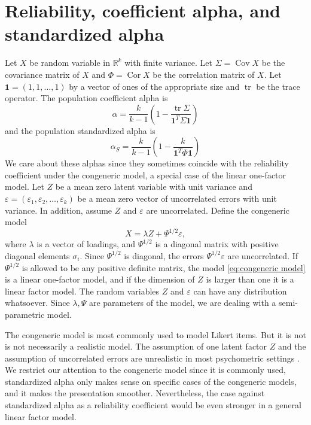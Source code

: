 \documentclass[twoside]{article}
\DeclareMathOperator{\tr}{tr}
\DeclareMathOperator{\Cor}{Cor}
\DeclareMathOperator{\Cov}{Cov}
\begin{document}
\section{Reliability, coefficient alpha, and standardized alpha}
\label{sec:coefficienta alpha}

Let $X$ be random variable in $\mathbb{R}^{k}$ with finite variance.
Let $\Sigma=\Cov X$ be the covariance matrix of $X$ and $\Phi=\Cor X$
be the correlation matrix of $X$. Let $\boldsymbol{1}=(1,1,\ldots,1)$ by a vector of ones of the appropriate size and $\tr$ be the trace operator.
The population coefficient alpha \citep[][eq. 2]{cronbach1951coefficient} is
\begin{equation}
\alpha =  \frac{k}{k-1}\left(1-\frac{\tr\Sigma}{\boldsymbol{1}^{T}\Sigma\boldsymbol{1}}\right)\label{eq:Coefficient alpha}
\end{equation}
and the population standardized alpha \citep[][eq. 2]{Falk2011-ae} is
\begin{equation}
\alpha_S=\frac{k}{k-1}\left(1-\frac{k}{\boldsymbol{1}^{T}\Phi\boldsymbol{1}}\right)\label{eq:standardized alpha}
\end{equation}
We care about these alphas since they sometimes coincide with the reliability coefficient under the congeneric model, a special case of the linear one-factor model. Let $Z$ be a mean zero latent variable with unit variance and $\varepsilon=(\varepsilon_{1},\varepsilon_{2},\ldots,\varepsilon_{k})$
be a mean zero vector of uncorrelated errors with unit variance. In addition, assume $Z$ and $\varepsilon$ are uncorrelated. Define the congeneric model
\begin{equation}
X=\lambda Z+\Psi^{1/2}\varepsilon,\label{eq:congeneric model}
\end{equation}
where $\lambda$ is a vector of loadings, and $\Psi^{1/2}$ is a diagonal matrix with positive diagonal elements $\sigma_i$. Since $\Psi^{1/2}$ is diagonal, the errors $\Psi^{1/2}\varepsilon$ are uncorrelated. If $\Psi^{1/2}$ is allowed to be any positive definite matrix, the model \eqref{eq:congeneric model} is a linear one-factor model, and if the dimension of $Z$ is larger than one it is a linear factor model. The random variables $Z$ and $\varepsilon$ can have any distribution whatsoever. Since $\lambda,\Psi$ are parameters of the model, we are dealing with a semi-parametric model. 

The congeneric model is most commonly used to model Likert items. But it is not is not necessarily a realistic model. The assumption of one latent factor $Z$ and the assumption of uncorrelated errors are unrealistic in most psychometric settings \citep[][Section 1.2 -- 1.3]{Green2009-le}. We restrict our attention to the congeneric model since it is commonly used, standardized alpha only makes sense on specific cases of the congeneric models, and it makes the presentation smoother. Nevertheless, the case against standardized alpha as a reliability coefficient would be even stronger in a general linear factor model. 
\end{document}
